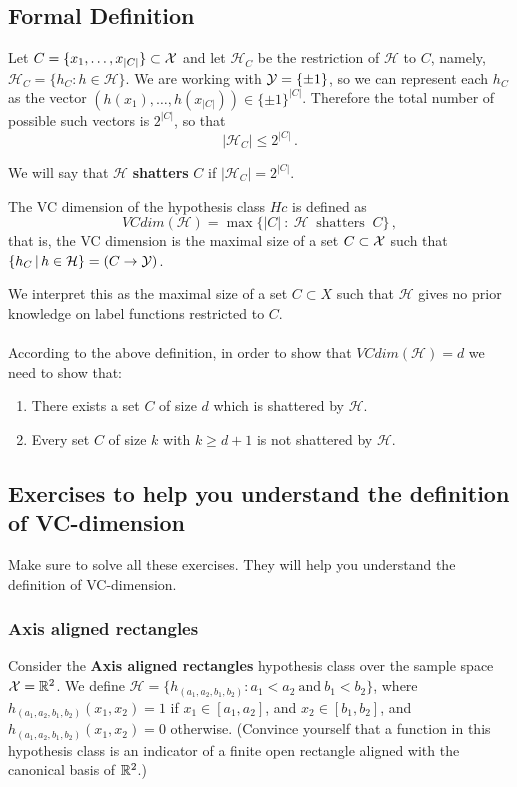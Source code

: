 \documentclass[11pt]{article}
\newcommand{\Hc}{\mathcal{H}}
\begin{document}
\subsection{Formal Definition}

Let $C = \{x_1,\ldots,x_{|C|}\} \subset \mathcal{X}$ and let $\Hc_C$ be the restriction of $\Hc$ to $C$, namely,
 $\Hc_C = \{ h_C : h \in \Hc\}$.
We are working with $\mathcal{Y}=\{\pm 1\}$, so we can represent each $h_C$ as the vector $(h(x_1),\ldots,h(x_{|C|})) \in \{\pm 1\}^{|C|}$. Therefore the total number of possible such vectors is $2^{|C|}$, so that
$$|\Hc_C| \le 2^{|C|}\,.$$

We will say that $\Hc$ \textbf{shatters} $C$ if $|\Hc_C| =  2^{|C|}$.  
\begin{definition}
The VC dimension of the hypothesis class $Hc$ is defined as 
$$VCdim(\Hc) = \max\{ |C| ~:~ \Hc~\,\,\textrm{shatters}~\,\,C \}\,,$$
that is, the VC dimension is the maximal size of a set $C\subset \mathcal{X}$ such that $\{h_C\,|\,h\in\Hc\} = (C\to\Y)$.
\end{definition}
We interpret this as the maximal size of a set $C\subset X$ such that 
$\Hc$ gives no prior knowledge on label functions restricted to $C$.
%
\\~\\
According to the above definition, in order to show that $VCdim(\Hc) = d$ we need to show that:
\begin{enumerate}
\item There exists a set $C$ of size $d$ which is shattered by $\Hc$.
\item Every set $C$ of size $k$ with $k\geq d+1$ is not shattered by $\Hc$.
\end{enumerate}

\subsection{Exercises to help you understand the definition of VC-dimension}

Make sure to solve all these exercises. They will help you understand the
definition of VC-dimension.

\subsubsection{Axis aligned rectangles}
Consider the \textbf{Axis aligned rectangles} hypothesis class over the sample space 
$\mathcal{X} = \mathbb{R}^2$. We define $\Hc = \{h_{(a_1,  a_2, b_1 , b_2)}: a_1 < a_2 ~\text{and}~  b_1 < b_2 \}$, 
where $ h_{(a_1, a_2, b_1 , b_2)}(x_1,x_2) = 1$ if $x_1 \in [a_1,a_2]$, and $x_2 \in [b_1,b_2]$, and  $ h_{(a_1, a_2, b_1 , b_2)}(x_1,x_2) = 0$ otherwise. (Convince yourself that a function in this hypothesis class is an indicator of a finite open rectangle aligned with the canonical basis of $\mathbb{R}^2$.)
\end{document}
